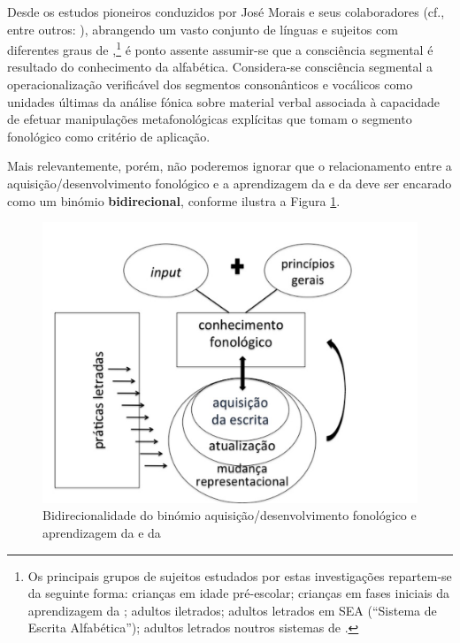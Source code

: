 \documentclass[output=paper]{LSP/langsci}
\begin{document}
Desde os estudos pioneiros conduzidos por José Morais e seus colaboradores (cf., entre outros: \citealt{alegriamorais1979,morais_etal1979,nakamura_etal1998}), abrangendo um vasto conjunto de línguas e sujeitos com diferentes graus de ,\footnote{Os principais grupos de sujeitos estudados por estas investigações repartem-se da seguinte forma: crianças em idade pré-escolar; crianças em fases iniciais da aprendizagem da ; adultos iletrados; adultos letrados em SEA (``Sistema de Escrita Alfabética''); adultos letrados noutros sistemas de .} é ponto assente assumir-se que a consciência segmental é resultado do conhecimento da  alfabética. Considera-se consciência segmental a operacionalização verificável dos segmentos consonânticos e vocálicos como unidades últimas da análise fónica sobre material verbal associada à capacidade de efetuar manipulações metafonológicas explícitas que tomam o segmento fonológico como critério de aplicação.

Mais relevantemente, porém, não poderemos ignorar que o relacionamento entre a aquisição/desenvolvimento fonológico e a aprendizagem da  e da  deve ser encarado como um binómio \textbf{bidirecional}, conforme ilustra a Figura \ref{fig:miranda_1}.

\begin{figure}
  \includegraphics[height=.3\textheight]{figures/miranda_1.png}
  \caption{Bidirecionalidade do binómio aquisição/desenvolvimento fonológico e aprendizagem da  e da  \citep{miranda2014}}
  \label{fig:miranda_1}
\end{figure}
\end{document}
